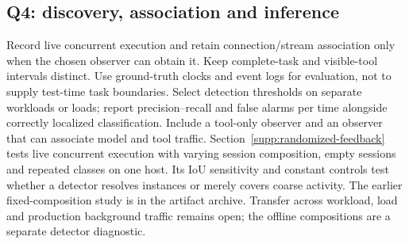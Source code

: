 \subsection{Q4: discovery, association and inference}
Record live concurrent execution and retain connection/stream association only when the chosen observer can obtain it. Keep complete-task and visible-tool intervals distinct. Use ground-truth clocks and event logs for evaluation, not to supply test-time task boundaries. Select detection thresholds on separate workloads or loads; report precision--recall and false alarms per time alongside correctly localized classification. Include a tool-only observer and an observer that can associate model and tool traffic. Section~\ref{supp:randomized-feedback} tests live concurrent execution with varying session composition, empty sessions and repeated classes on one host. Its IoU sensitivity and constant controls test whether a detector resolves instances or merely covers coarse activity. The earlier fixed-composition study is in the artifact archive. Transfer across workload, load and production background traffic remains open; the offline compositions are a separate detector diagnostic.
